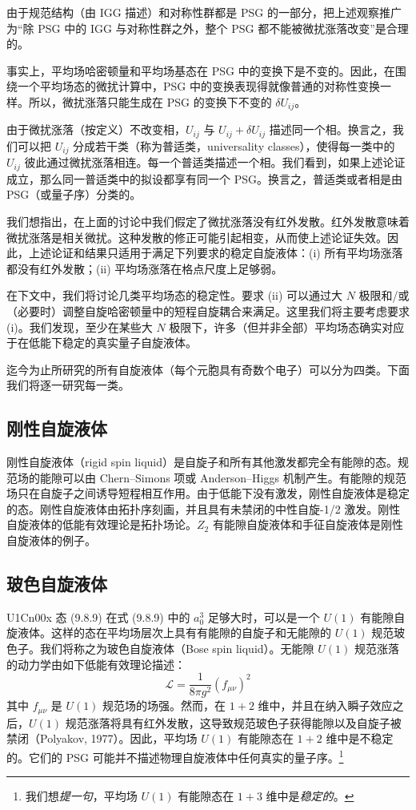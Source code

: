 由于规范结构（由 IGG 描述）和对称性群都是 PSG 的一部分，把上述观察推广为“除 PSG 中的 IGG 与对称性群之外，整个 PSG 都不能被微扰涨落改变”是合理的。

事实上，平均场哈密顿量和平均场基态在 PSG 中的变换下是不变的。因此，在围绕一个平均场态的微扰计算中，PSG 中的变换表现得就像普通的对称性变换一样。所以，微扰涨落只能生成在 PSG 的变换下不变的 $\delta U_{ij}$。

由于微扰涨落（按定义）不改变相，$U_{ij}$ 与 $U_{ij}+\delta U_{ij}$ 描述同一个相。换言之，我们可以把 $U_{ij}$ 分成若干类（称为普适类，universality classes），使得每一类中的 $U_{ij}$ 彼此通过微扰涨落相连。每一个普适类描述一个相。我们看到，如果上述论证成立，那么同一普适类中的拟设都享有同一个 PSG。换言之，普适类或者相是由 PSG（或量子序）分类的。

我们想指出，在上面的讨论中我们假定了微扰涨落没有红外发散。红外发散意味着微扰涨落是相关微扰。这种发散的修正可能引起相变，从而使上述论证失效。因此，上述论证和结果只适用于满足下列要求的稳定自旋液体：(i) 所有平均场涨落都没有红外发散；(ii) 平均场涨落在格点尺度上足够弱。

在下文中，我们将讨论几类平均场态的稳定性。要求 (ii) 可以通过大 $N$ 极限和/或（必要时）调整自旋哈密顿量中的短程自旋耦合来满足。这里我们将主要考虑要求 (i)。我们发现，至少在某些大 $N$ 极限下，许多（但并非全部）平均场态确实对应于在低能下稳定的真实量子自旋液体。

迄今为止所研究的所有自旋液体（每个元胞具有奇数个电子）可以分为四类。下面我们将逐一研究每一类。

\subsection{刚性自旋液体}

刚性自旋液体（rigid spin liquid）是自旋子和所有其他激发都完全有能隙的态。规范场的能隙可以由 Chern--Simons 项或 Anderson--Higgs 机制产生。有能隙的规范场只在自旋子之间诱导短程相互作用。由于低能下没有激发，刚性自旋液体是稳定的态。刚性自旋液体由拓扑序刻画，并且具有未禁闭的中性自旋-1/2 激发。刚性自旋液体的低能有效理论是拓扑场论。$Z_2$ 有能隙自旋液体和手征自旋液体是刚性自旋液体的例子。

\subsection{玻色自旋液体}

U1Cn00x 态 (9.8.9) 在式 (9.8.9) 中的 $a_{0}^{3}$ 足够大时，可以是一个 $U(1)$ 有能隙自旋液体。这样的态在平均场层次上具有有能隙的自旋子和无能隙的 $U(1)$ 规范玻色子。我们将称之为玻色自旋液体（Bose spin liquid）。无能隙 $U(1)$ 规范涨落的动力学由如下低能有效理论描述：
\begin{equation*}
\mathcal{L}=\frac{1}{8\pi g^{2}}\left(f_{\mu\nu}\right)^{2}
\end{equation*}
其中 $f_{\mu\nu}$ 是 $U(1)$ 规范场的场强。然而，在 $1+2$ 维中，并且在纳入瞬子效应之后，$U(1)$ 规范涨落将具有红外发散，这导致规范玻色子获得能隙以及自旋子被禁闭（Polyakov, 1977）。因此，平均场 $U(1)$ 有能隙态在 $1+2$ 维中是不稳定的。它们的 PSG 可能并不描述物理自旋液体中任何真实的量子序。\footnote{我们想\emph{提一句}，平均场 $U(1)$ 有能隙态在 $1+3$ 维中是\emph{稳定的}。}

